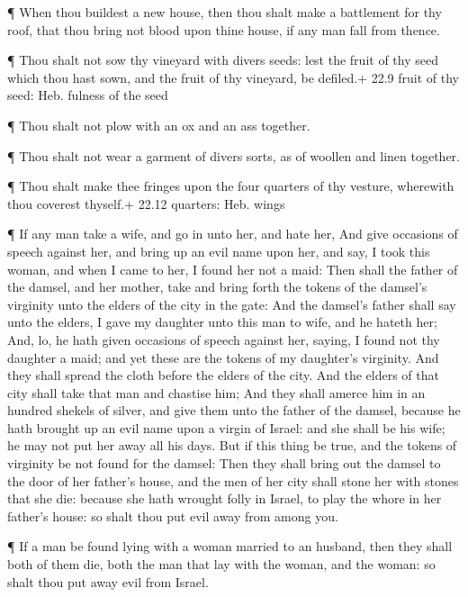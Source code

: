  ¶ When thou buildest a new house, then thou shalt make a
battlement for thy roof, that thou bring not blood upon thine house, if
any man fall from thence.

 ¶ Thou shalt not sow thy vineyard with divers seeds: lest
the fruit of thy seed which thou hast sown, and the fruit of thy
vineyard, be defiled.+ 22.9 fruit of thy seed: Heb. fulness of the seed

 ¶ Thou shalt not plow with an ox and an ass together.

 ¶ Thou shalt not wear a garment of divers sorts, as of
woollen and linen together.

 ¶ Thou shalt make thee fringes upon the four quarters of
thy vesture, wherewith thou coverest thyself.+ 22.12 quarters: Heb.
wings

 ¶ If any man take a wife, and go in unto her, and hate
her,  And give occasions of speech against her, and bring
up an evil name upon her, and say, I took this woman, and when I came to
her, I found her not a maid:  Then shall the father of the
damsel, and her mother, take and bring forth the tokens of the damsel's
virginity unto the elders of the city in the gate:  And the
damsel's father shall say unto the elders, I gave my daughter unto this
man to wife, and he hateth her;  And, lo, he hath given
occasions of speech against her, saying, I found not thy daughter a
maid; and yet these are the tokens of my daughter's virginity. And they
shall spread the cloth before the elders of the city.  And
the elders of that city shall take that man and chastise him;
 And they shall amerce him in an hundred shekels of silver,
and give them unto the father of the damsel, because he hath brought up
an evil name upon a virgin of Israel: and she shall be his wife; he may
not put her away all his days.  But if this thing be true,
and the tokens of virginity be not found for the damsel: 
Then they shall bring out the damsel to the door of her father's house,
and the men of her city shall stone her with stones that she die:
because she hath wrought folly in Israel, to play the whore in her
father's house: so shalt thou put evil away from among you.

 ¶ If a man be found lying with a woman married to an
husband, then they shall both of them die, both the man that lay with
the woman, and the woman: so shalt thou put away evil from Israel.

